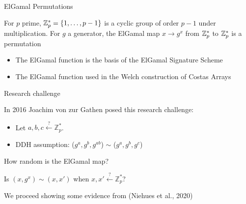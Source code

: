 
\begin{frame}{ElGamal Permutations}

For $p$ prime, $\mathbb{Z}_p^* = \{1, \ldots, p-1\}$ is a cyclic group of order $p-1$ under multiplication. For $g$ a generator, the ElGamal map $x \to g^x$ from $\mathbb{Z}_p^*$ to $\mathbb{Z}_p^*$ is a permutation
\vspace{1cm}

\begin{itemize}
\item The ElGamal function is the basis of the ElGamal Signature Scheme
  \item The ElGamal function used in the Welch construction of Costas Arrays
  \end{itemize}

  
\end{frame}




\begin{frame}{Research challenge}

In 2016 Joachim von zur Gathen posed this research challenge:

\begin{itemize}
    \item Let $a,b,c \overset{?}{\gets} \mathbb{Z}_p^*$.
    \item DDH assumption: ($g^a, g^b, g^{ab}$) $\sim$ ($g^a, g^b, g^c$)
\end{itemize}

\pause
\vspace{10pt}
\begin{center}
    {\Large
        How random is the ElGamal map?
        
        Is $ (x, g^x) \sim  (x, x')$  when $x,x' \overset{?}{\gets} \mathbb{Z}_p^*$?
    }
\end{center}

\pause
\vspace{10pt}
    We proceed showing some evidence from (Niehues et al., 2020)

\end{frame}





